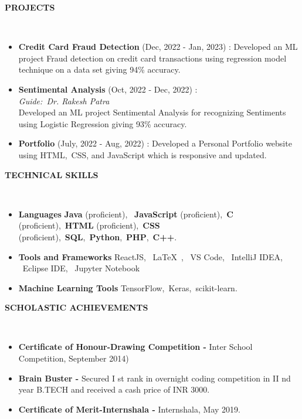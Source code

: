 \documentclass[a4paper,10pt]{article}
\newcommand{\lsep}{-0.5cm}
\newcommand{\resheading}[1]{{\small \colorbox{mygrey}{\begin{minipage}{0.975\textwidth}{\textbf{#1 \vphantom{p\^{E}}}}\end{minipage}}}}
\begin{document}
\resheading{\textbf{PROJECTS} }\\[\lsep]
\begin{itemize}
\setlength\itemsep{0.5em}
\item \textbf{Credit Card Fraud Detection} (Dec, 2022 - Jan, 2023) : Developed an ML project Fraud detection on credit card transactions using regression model technique on a data set giving 94\% accuracy.

\item \textbf{Sentimental Analysis} (Oct, 2022 - Dec, 2022) : \\
\textit{Guide:\ Dr. Rakesh Patra}\\
Developed an ML project Sentimental Analysis for recognizing
Sentiments using Logistic Regression giving 93\% accuracy.
\item \textbf{Portfolio} (July, 2022 - Aug, 2022) : Developed a Personal Portfolio website using HTML,\ CSS, and JavaScript
which is responsive and updated.
\end{itemize}

\resheading{\textbf{TECHNICAL SKILLS} }\\[\lsep]
\begin{itemize}
\setlength\itemsep{0em}
\item \noindent \textbf{Languages} \textbf{Java} (proficient), \ \textbf{JavaScript} (proficient),\ \textbf{C} (proficient),\ \textbf{HTML} (proficient),\ \textbf{CSS} (proficient),\ \textbf{SQL},\ \textbf{Python},\ \textbf{PHP},\ \textbf{C++}.\ \\
 \item \noindent\textbf{Tools and Frameworks} ReactJS, \  \LaTeX\ , \ VS Code, \ IntelliJ IDEA, \ Eclipse IDE, \ Jupyter Notebook
\item \noindent \textbf{Machine Learning Tools} TensorFlow,\ Keras,\ scikit-learn.
\end{itemize}

\resheading{\textbf{SCHOLASTIC ACHIEVEMENTS} }\\[\lsep]
\begin{itemize}
\setlength\itemsep{0em}
\item \noindent \textbf{Certificate of Honour-Drawing Competition - }Inter School Competition, September 2014)
\item \noindent\textbf{Brain Buster - }Secured I st rank in overnight coding competition in II nd year B.TECH and received a cash price of INR
3000.
\item \noindent\textbf{Certificate of Merit-Internshala - }Internshala, May 2019.

\end{itemize}
\end{document}
